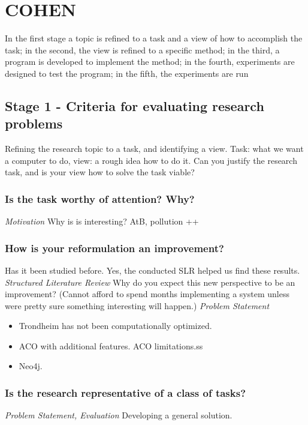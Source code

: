 \section{COHEN}

In the first stage a topic is refined to a task and a view of how to accomplish the task; in the second, the view is refined to a specific method; in the third, a program is developed to implement the method; in the fourth, experiments are designed to test the program; in the fifth, the experiments are run\citep{cohen88}

\subsection{Stage 1 - Criteria for evaluating research problems}
Refining the research topic to a task, and identifying a view.
Task: what we want a computer to do, view: a rough idea how to do it. Can you justify the research task, and is your view how to solve the task viable? 

\subsubsection{Is the task worthy of attention? Why?}
\emph{\color{orange} Motivation}
Why is is interesting? AtB, pollution ++ 

\subsubsection{How is your reformulation an improvement?}
Has it been studied before. Yes, the conducted SLR helped us find these results.\emph{\color{orange} Structured Literature Review}
Why do you expect this new perspective to be an improvement? (Cannot afford to spend months implementing a system unless were pretty sure something interesting will happen.)\emph{\color{orange} Problem Statement}
\begin{itemize}
\item Trondheim has not been computationally optimized.
\item ACO with additional features. ACO limitations.ss
\item Neo4j.
\end{itemize}

\subsubsection{Is the research representative of a class of tasks?}
\emph{\color{orange} Problem Statement, Evaluation}
Developing a general solution.

